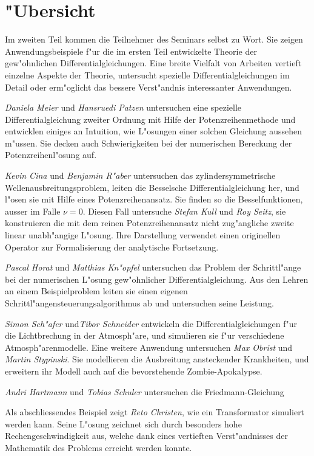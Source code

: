 %
%
%
\chapter*{"Ubersicht}
\rhead{}
\label{skript:uebersicht}
Im zweiten Teil kommen die Teilnehmer des Seminars selbst zu Wort.
Sie zeigen Anwendungsbeispiele f"ur die im ersten
Teil entwickelte Theorie der gew"ohnlichen Differentialgleichungen.
Eine breite Vielfalt von Arbeiten vertieft einzelne Aspekte der Theorie,
untersucht spezielle Differentialgleichungen im Detail
oder erm"oglicht das bessere Verst"andnis interessanter Anwendungen.

{\em Daniela Meier} und {\em Hansruedi Patzen} untersuchen eine spezielle
Differentialgleichung zweiter Ordnung mit Hilfe der Potenzreihenmethode
und entwicklen einiges an Intuition, wie L"osungen einer solchen Gleichung
aussehen m"ussen.
Sie decken auch Schwierigkeiten bei der numerischen Bereckung der
Potenzreihenl"osung auf.

{\em Kevin Cina} und {\em Benjamin R"aber} untersuchen das zylindersymmetrische
Wellenausbreitungsproblem, leiten die Besselsche Differentialgleichung
her, und l"osen sie mit Hilfe eines Potenzreihenansatz.
Sie finden so die Besselfunktionen, ausser im Falle $\nu =0$.
Diesen Fall untersuche {\em Stefan Kull} und {\em Roy Seitz}, sie konstruieren
die mit dem reinen Potenzreihenansatz nicht zug"angliche zweite linear
unabh"angige L"osung.
Ihre Darstellung verwendet einen originellen Operator zur Formalisierung
der analytische Fortsetzung.

{\em Pascal Horat} und {\em Matthias Kn"opfel} untersuchen das Problem
der Schrittl"ange bei der numerischen L"osung gew"ohnlicher
Differentialgleichung.
Aus den Lehren an einem Beispielproblem leiten sie einen eigenen
Schrittl"angensteuerungsalgorithmus ab und untersuchen seine Leistung.

{\em Simon Sch"afer} und{\em Tibor Schneider} entwickeln die
Differentialgleichungen f"ur die Lichtbrechung in der Atmosph"are, und
simulieren sie f"ur verschiedene Atmosph"arenmodelle.
Eine weitere Anwendung untersuchen {\em Max Obrist} und {\em Martin Stypinski}.
Sie modellieren die Ausbreitung ansteckender Krankheiten, und erweitern
ihr Modell auch auf die bevorstehende Zombie-Apokalypse.

{\em Andri Hartmann} und {\em Tobias Schuler} untersuchen die 
Friedmann-Gleichung

Als abschliessendes Beispiel zeigt {\em Reto Christen}, wie ein Transformator
simuliert werden kann. 
Seine L"osung zeichnet sich durch besonders hohe Rechengeschwindigkeit aus,
welche dank eines vertieften Verst"andnisses der Mathematik des Problems
erreicht werden konnte.











